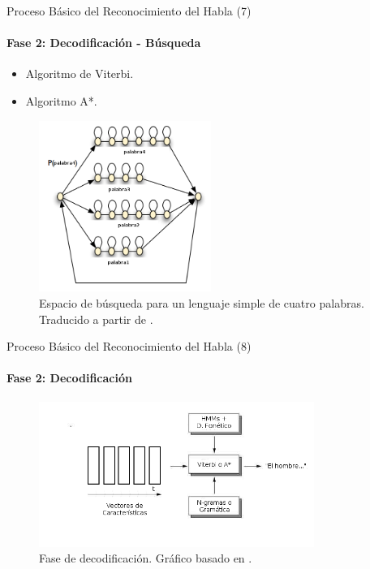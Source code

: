 \begin{frame}{Proceso B\'asico del Reconocimiento del Habla (7)}
\framesubtitle{Fase 2: Decodificaci\'on - Búsqueda}

\begin{itemize}
    \item Algoritmo de Viterbi.
    \item Algoritmo A*.
\end{itemize}

\begin{figure}[H] 
\centering
\includegraphics[width=0.5\textwidth]{./graphics/espacio.png}
\caption{Espacio de b\'usqueda para un lenguaje simple de cuatro palabras. Traducido a partir de \cite{RenalsSearch}.}
\label{figure:espacio-busqueda}
\end{figure}

\end{frame}


\begin{frame}{Proceso B\'asico del Reconocimiento del Habla (8)}
\framesubtitle{Fase 2: Decodificaci\'on}
\begin{figure}[H] 
\centering
\includegraphics[width=0.8\textwidth]{./graphics/decodificacion.png}
\caption{Fase de decodificaci\'on. Gr\'afico basado en \cite{VerenichASR}.}
\label{figure:decoding}
\end{figure}
\end{frame}
